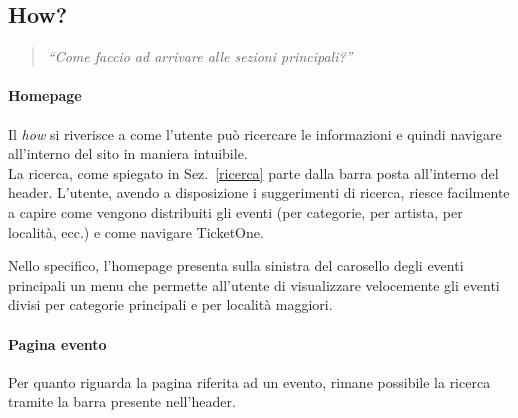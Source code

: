 \subsection{How?}
	\begin{quote}
		\emph{``Come faccio ad arrivare alle sezioni principali?''}
	\end{quote}
	\paragraph{Homepage}
		Il \textit{how} si riverisce a come l'utente può ricercare le informazioni e quindi navigare all'interno del sito in maniera intuibile.\\
		La ricerca, come spiegato in Sez.~\ref{ricerca} parte dalla barra posta all'interno del header.
		L'utente, avendo a disposizione i suggerimenti di ricerca, riesce facilmente a capire come vengono distribuiti gli eventi (per categorie, per artista, per località, ecc.) e come navigare TicketOne.
		\par Nello specifico, l'homepage presenta sulla sinistra del carosello degli eventi principali un menu che permette all'utente di visualizzare velocemente gli eventi divisi per categorie principali e per località maggiori.
		
	\paragraph{Pagina evento}
		Per quanto riguarda la pagina riferita ad un evento, rimane possibile la ricerca tramite la barra presente nell'header.
		